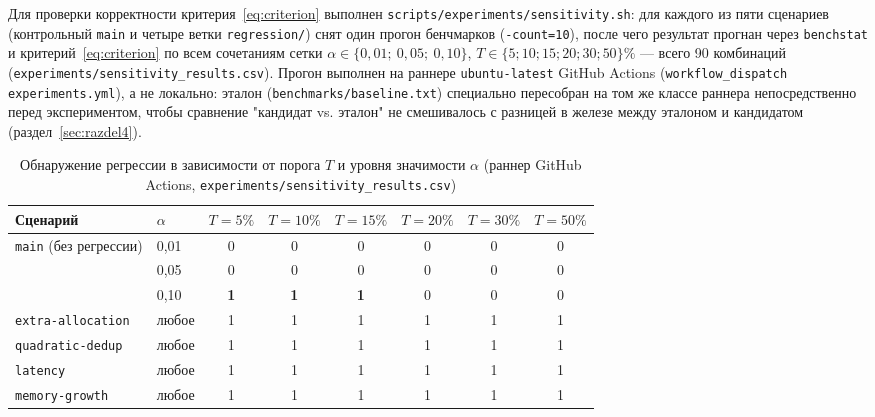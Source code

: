 \documentclass[12pt,a4paper]{article}
\numberwithin{equation}{section}
\begin{document}
Для проверки корректности критерия~\eqref{eq:criterion} выполнен
\texttt{scripts/\allowbreak experiments/\allowbreak sensitivity.sh}: для каждого из пяти сценариев
(контрольный \texttt{main} и четыре ветки \texttt{regression/\allowbreak *}) снят один
прогон бенчмарков (\texttt{-count=10}), после чего результат прогнан через
\texttt{benchstat} и критерий~\eqref{eq:criterion} по всем сочетаниям сетки
$\alpha \in \{0{,}01;\ 0{,}05;\ 0{,}10\}$, $T \in \{5;10;15;20;30;50\}\%$ —
всего 90 комбинаций (\texttt{experiments/\allowbreak sensitivity\_results.csv}).
Прогон выполнен на раннере \texttt{ubuntu-latest} GitHub Actions
(\texttt{workflow\_dispatch} \texttt{experiments.yml}), а не локально: эталон
(\texttt{benchmarks/\allowbreak baseline.txt}) специально пересобран на том же классе
раннера непосредственно перед экспериментом, чтобы сравнение "кандидат vs.
эталон" не смешивалось с разницей в железе между эталоном и кандидатом
(раздел~\ref{sec:razdel4}).

\begin{table}[htbp]
\caption{Обнаружение регрессии в зависимости от порога $T$ и уровня значимости $\alpha$ (раннер GitHub Actions, \texttt{experiments/sensitivity\_results.csv})}
\label{tab:5.2}
\centering
\begin{tabular}{llcccccc}
\toprule
Сценарий & $\alpha$ & $T{=}5\%$ & $T{=}10\%$ & $T{=}15\%$ & $T{=}20\%$ & $T{=}30\%$ & $T{=}50\%$ \\
\midrule
\multirow{3}{*}{\texttt{main} (без регрессии)}
 & 0,01 & 0 & 0 & 0 & 0 & 0 & 0 \\
 & 0,05 & 0 & 0 & 0 & 0 & 0 & 0 \\
 & 0,10 & \textbf{1} & \textbf{1} & \textbf{1} & 0 & 0 & 0 \\
\midrule
\texttt{extra-allocation} & любое & 1 & 1 & 1 & 1 & 1 & 1 \\
\texttt{quadratic-dedup} & любое & 1 & 1 & 1 & 1 & 1 & 1 \\
\texttt{latency} & любое & 1 & 1 & 1 & 1 & 1 & 1 \\
\texttt{memory-growth} & любое & 1 & 1 & 1 & 1 & 1 & 1 \\
\bottomrule
\end{tabular}
\end{table}
\end{document}
